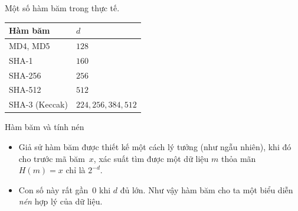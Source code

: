 \begin{frame}
	\begin{xmpl}
	Một số hàm băm trong thực tế.
	\begin{center}
	  \begin{tabular}[h]{|l|l|}
	\hline 
	    \textbf{Hàm băm} & $d$  \\
	    \hline 
	    MD4, MD5 & $128$ \\
	    SHA-1 & $160$ \\
	    SHA-256 &$256$ \\
	    SHA-512 &$512$\\
	    SHA-3 (Keccak) &$224, 256, 384, 512$ \\
	\hline 
	  \end{tabular}
	\end{center}
	\end{xmpl}
\end{frame}

\begin{frame}{Hàm băm và tính nén}
	\begin{itemize}
		\item 	Giả sử  hàm băm được thiết kế một cách lý tưởng (như ngẫu nhiên), khi đó  cho trước mã băm~$x$, xác suất tìm được   một dữ liệu  $m$ thỏa mãn  $H(m) = x$ chỉ là $2^{-d}$. 
	
	\item Con số này rất gần~$0$ khi $d$ đủ lớn. Như vậy hàm băm cho ta một biểu diễn \textit{nén} hợp lý của dữ liệu.

	\end{itemize}
	
\end{frame}

